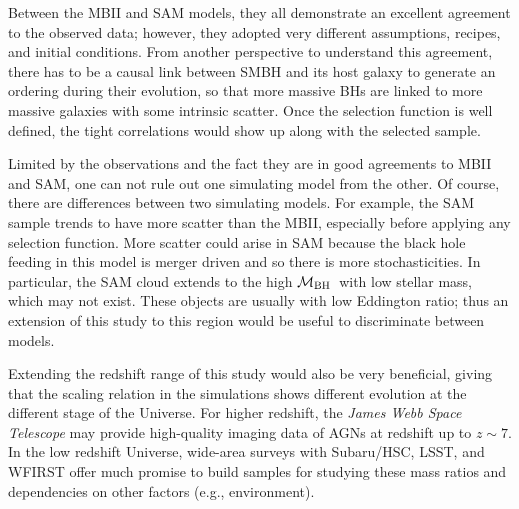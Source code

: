 \documentclass{natureprintstyle}
\newcommand{\mbh}{$\mathcal M_{\rm BH}$}
\newcommand{\lhost}{$L_{\rm host}$}
\newcommand{\mstar}{{$M_*$}}
\begin{document}
Between the MBII and SAM models, they all demonstrate an excellent agreement to the observed data; however, they adopted very different assumptions, recipes, and initial conditions. From another perspective to understand this agreement, there has to be a causal link between SMBH and its host galaxy to generate an ordering during their evolution, so that more massive BHs are linked to more massive galaxies with some intrinsic scatter. Once the selection function is well defined, the tight correlations would show up along with the selected sample.

Limited by the observations and the fact they are in good agreements to MBII and SAM, one can not rule out one simulating model from the other. Of course, there are differences between two simulating models. For example, the SAM sample trends to have more scatter than the MBII, especially before applying any selection function. More scatter could arise in SAM because the black hole feeding in this model is merger driven and so there is more stochasticities. In particular, the SAM cloud extends to the high \mbh\ with low stellar mass, which may not exist. These objects are usually with low Eddington ratio; thus an extension of this study to this region would be useful to discriminate between models.

Extending the redshift range of this study would also be very beneficial, giving that the scaling relation in the simulations shows different evolution at the different stage of the Universe. For higher redshift, the {\it James Webb Space Telescope} may provide high-quality imaging data of AGNs at redshift up to $z\sim7$. In the low redshift Universe, wide-area surveys with Subaru/HSC, LSST, and WFIRST offer much promise to build samples for studying these mass ratios and dependencies on other factors (e.g., environment).



\end{document}
